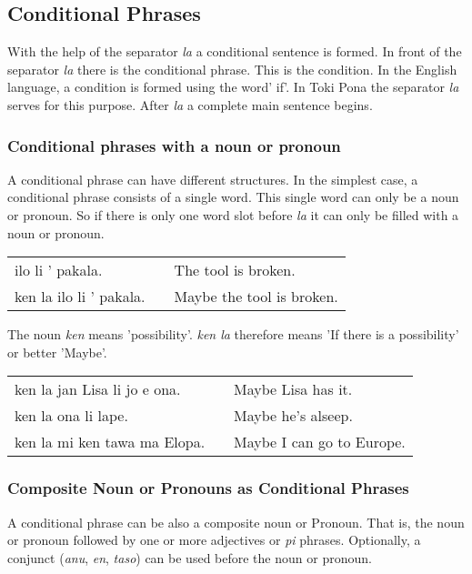 \subsection*{Conditional Phrases}
%
%
With the help of the separator \textit{la} a conditional sentence is formed.
In front of the separator \textit{la} there is the conditional phrase. 
This is the condition. 
In the English language, a condition is formed using the word' if'.
In Toki Pona the separator \textit{la} serves for this purpose. 
After \textit{la} a complete main sentence begins.

%
\subsubsection*{Conditional phrases with a noun or pronoun}
%
%
A conditional phrase can have different structures. 
In the simplest case, a conditional phrase consists of a single word. 
This single word can only be a noun or pronoun. 
So if there is only one word slot before \textit{la} it can only be filled with a noun or pronoun. 

\begin{supertabular}{p{5,5cm}|ll}
ilo li ' pakala. && The tool is broken. \\
ken la ilo li ' pakala. && Maybe the tool is broken. \\
\end{supertabular} 

The noun \textit{ken} means 'possibility'.
\textit{ken la} therefore means 'If there is a possibility' or better 'Maybe'.
 
\begin{supertabular}{p{5,5cm}|ll}
ken la jan Lisa li jo e ona. && Maybe Lisa has it. \\
ken la ona li lape. && Maybe he's alseep. \\
ken la mi ken tawa ma Elopa. && Maybe I can go to Europe. \\
\end{supertabular} 

%
%
\subsubsection*{Composite Noun or Pronouns as Conditional Phrases}
%
%
A conditional phrase can be also a composite noun or Pronoun. 
That is, the noun or pronoun followed by one or more adjectives or \textit{pi} phrases.
Optionally, a conjunct (\textit{anu}, \textit{en}, \textit{taso}) can be used before the noun or pronoun. 

